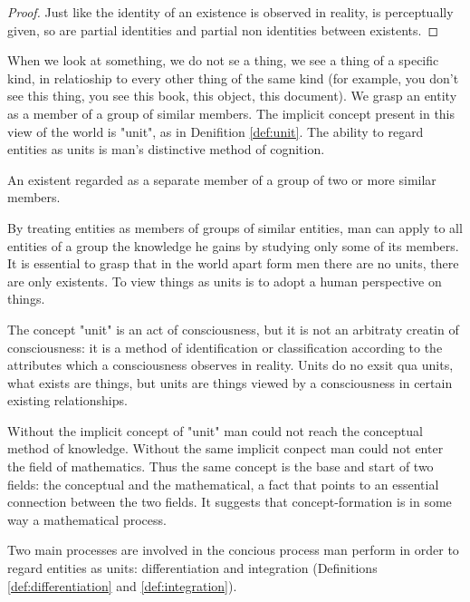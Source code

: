             \begin{proof}
                Just like the identity of an existence is observed in reality, is perceptually given, so are partial identities and partial non identities between existents.
            \end{proof}

        When we look at something, we do not se a thing, we see a thing of a specific kind, in relatioship to every other thing of the same kind (for example, you don't see this thing, you see this book, this object, this document). We grasp an entity as a member of a group of similar members. The implicit concept present in this view of the world is "unit", as in Denifition \ref{def:unit}. The ability to regard entities as units is man's distinctive method of cognition.

            \begin{definition}[Unit]
            \label{def:unit}
                An existent regarded as a separate member of a group of two or more similar members.
            \end{definition}

        By treating entities as members of groups of similar entities, man can apply to all entities of a group the knowledge he gains by studying only some of its members. It is essential to grasp that in the world apart form men there are no units, there are only existents. To view things as units is to adopt a human perspective on things.

        The concept "unit" is an act of consciousness, but it is not an arbitraty creatin of consciousness: it is a method of identification or classification according to the attributes which a consciousness observes in reality. Units do no exsit qua units, what exists are things, but units are things viewed by a consciousness in certain existing relationships.

        Without the implicit concept of "unit" man could not reach the conceptual method of knowledge. Without the same implicit conpect man could not enter the field of mathematics. Thus the same concept is the base and start of two fields: the conceptual and the mathematical, a fact that points to an essential connection between the two fields. It suggests that concept-formation is in some way a mathematical process.

        Two main processes are involved in the concious process man perform in order to regard entities as units: differentiation and integration (Definitions \ref{def:differentiation} and \ref{def:integration}).

